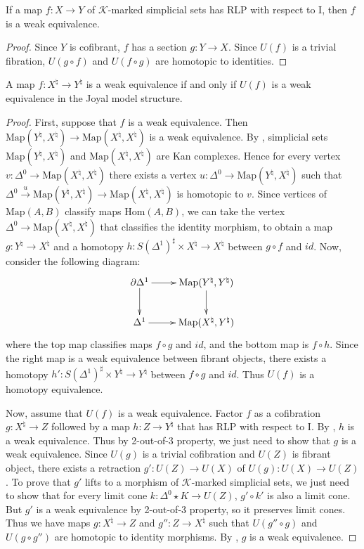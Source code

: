 \documentclass[reqno]{amsart}
\theoremstyle{definition}
\theoremstyle{remark}
\newcommand{\K}{$\mathcal{K}$}
\newcommand{\join}{\star}
\newcommand{\Hom}{\mathrm{Hom}}
\newcommand{\Map}{\mathrm{Map}}
\newcommand{\I}{\mathrm{I}}
\numberwithin{figure}{section}
\begin{document}
\begin{cor}[iinj]
If a map $f : X \to Y$ of \K-marked simplicial sets has RLP with respect to $\I$, then $f$ is a weak equivalence.
\end{cor}
\begin{proof}
Since $Y$ is cofibrant, $f$ has a section $g : Y \to X$.
Since $U(f)$ is a trivial fibration, $U(g \circ f)$ and $U(f \circ g)$ are homotopic to identities.
\end{proof}

\begin{prop}
A map $f : X^\natural \to Y^\natural$ is a weak equivalence if and only if $U(f)$ is a weak equivalence in the Joyal model structure.
\end{prop}
\begin{proof}
First, suppose that $f$ is a weak equivalence.
Then $\Map(Y^\natural,X^\natural) \to \Map(X^\natural,X^\natural)$ is a weak equivalence.
By , simplicial sets $\Map(Y^\natural,X^\natural)$ and $\Map(X^\natural,X^\natural)$ are Kan complexes.
Hence for every vertex $v : \Delta^0 \to \Map(X^\natural,X^\natural)$ there exists a vertex $u : \Delta^0 \to \Map(Y^\natural,X^\natural)$
such that $\Delta^0 \overset{u}\to \Map(Y^\natural,X^\natural) \to \Map(X^\natural,X^\natural)$ is homotopic to $v$.
Since vertices of $\Map(A,B)$ classify maps $\Hom(A,B)$, we can take the vertex $\Delta^0 \to \Map(X^\natural,X^\natural)$ that classifies the identity morphism,
to obtain a map $g : Y^\natural \to X^\natural$ and a homotopy $h : S(\Delta^1)^\sharp \times X^\natural \to X^\natural$ between $g \circ f$ and $id$.
Now, consider the following diagram:
\[ \xymatrix{ \partial \Delta^1 \ar[d] \ar[r] & \Map(Y^\natural,Y^\natural) \ar[d] \\
              \Delta^1 \ar[r] & \Map(X^\natural,Y^\natural)
            } \]
where the top map classifies maps $f \circ g$ and $id$, and the bottom map is $f \circ h$.
Since the right map is a weak equivalence between fibrant objects, there exists a homotopy $h' : S(\Delta^1)^\sharp \times Y^\natural \to Y^\natural$ between $f \circ g$ and $id$.
Thus $U(f)$ is a homotopy equivalence.

Now, assume that $U(f)$ is a weak equivalence.
Factor $f$ as a cofibration $g : X^\natural \to Z$ followed by a map $h : Z \to Y^\natural$ that has RLP with respect to $\I$.
By , $h$ is a weak equivalence.
Thus by 2-out-of-3 property, we just need to show that $g$ is a weak equivalence.
Since $U(g)$ is a trivial cofibration and $U(Z)$ is fibrant object, there exists a retraction $g' : U(Z) \to U(X)$ of $U(g) : U(X) \to U(Z)$.
To prove that $g'$ lifts to a morphism of \K-marked simplicial sets, we just need to show that for every limit cone $k : \Delta^0 \join K \to U(Z)$, $g' \circ k'$ is also a limit cone.
But $g'$ is a weak equivalence by 2-out-of-3 property, so it preserves limit cones.
Thus we have maps $g : X^\natural \to Z$ and $g'' : Z \to X^\natural$ such that $U(g'' \circ g)$ and $U(g \circ g'')$ are homotopic to identity morphisms.
By , $g$ is a weak equivalence.
\end{proof}
\end{document}
